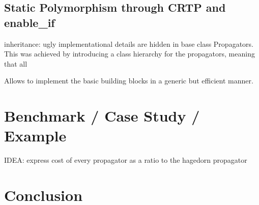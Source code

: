




\usepackage{tikz}
\usetikzlibrary{arrows,chains,matrix,positioning,scopes}











\clearemptydoublepage

\mbox{}
\vfill

\vfill
\tableofcontents

\clearpage

\listoffigures
\listofalgorithms

\clearemptydoublepage 
\clearpage 
\clearpage 
\clearpage 







\clearpage 

\subsection{Static Polymorphism through CRTP and enable\_if}
\label{subsec:poly}
inheritance: ugly implementational details are hidden in base class Propagators.
This was achieved by introducing a class hierarchy for the propagators, meaning that all 
\cite{C_CRTP}

Allows to implement the basic building blocks in a generic but efficient manner.




\clearpage
\section{Benchmark / Case Study / Example}

IDEA: express cost of every propagator as a ratio to the hagedorn propagator

\clearpage
\section{Conclusion}















